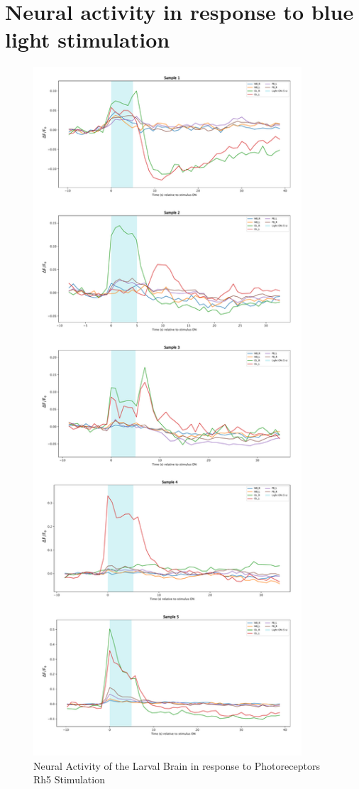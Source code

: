 \section{Neural activity in response to blue light stimulation}
    \begin{figure}
        \centering
        \includegraphics[width=10cm]{Figs/CX/RH5stimulation.pdf}
        \caption[Neural Activity of the Larval Brain in response to Photoreceptors Rh5 Stimulation]{Neural Activity of the Larval Brain in response to Photoreceptors Rh5 Stimulation}
        \label{RH5stimulation}
    \end{figure}





